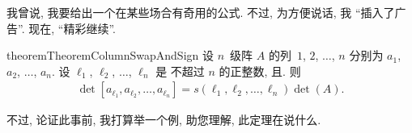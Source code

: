 \documentclass[%
    UTF8,%
    fontset=none,%
    punct=kaiming,%
    zihao=-4,%
    a4paper,%
    oneside,%
]{ctexbook}
\let\emph\relax
\begin{document}
\OptionalReading

我曾说, 我要给出一个在某些场合有奇用的公式.
不过, 为方便说话, 我 ``插入了广告''.
现在, ``精彩继续''.

\begin{restatable}[]{theorem}{TheoremColumnSwapAndSign}
    设 \(n\)~级阵 \(A\) 的列~\(1\), \(2\), \(\dots\), \(n\)
    分别为 \(a_1\), \(a_2\), \(\dots\), \(a_n\).
    设 \(\ell_1\), \(\ell_2\), \(\dots\), \(\ell_n\) 是%
    不超过 \(n\) 的正整数,
    且\emph{互不相同}.
    则
    \begin{align*}
        \det {[a_{\ell_1}, a_{\ell_2}, \dots, a_{\ell_n}]}
        = s(\ell_1, \ell_2, \dots, \ell_n) \det {(A)}.
    \end{align*}
\end{restatable}

不过, 论证此事前, 我打算举一个例,
助您理解, 此定理在说什么.
\end{document}
